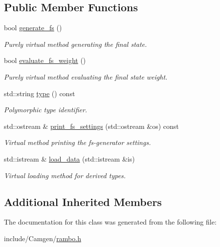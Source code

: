 \subsection*{Public Member Functions}
\begin{DoxyCompactItemize}
\item 
\hypertarget{a00458_a0fcb472d039e483f77b58305b4bd4986}{bool \hyperlink{a00458_a0fcb472d039e483f77b58305b4bd4986}{generate\-\_\-fs} ()}\label{a00458_a0fcb472d039e483f77b58305b4bd4986}

\begin{DoxyCompactList}\small\item\em Purely virtual method generating the final state. \end{DoxyCompactList}\item 
\hypertarget{a00458_ae6e268820d2de91b8282723f3a03eb91}{bool \hyperlink{a00458_ae6e268820d2de91b8282723f3a03eb91}{evaluate\-\_\-fs\-\_\-weight} ()}\label{a00458_ae6e268820d2de91b8282723f3a03eb91}

\begin{DoxyCompactList}\small\item\em Purely virtual method evaluating the final state weight. \end{DoxyCompactList}\item 
\hypertarget{a00458_a8badd899251b3c0b138354e50e755aad}{std\-::string \hyperlink{a00458_a8badd899251b3c0b138354e50e755aad}{type} () const }\label{a00458_a8badd899251b3c0b138354e50e755aad}

\begin{DoxyCompactList}\small\item\em Polymorphic type identifier. \end{DoxyCompactList}\item 
\hypertarget{a00458_aa10fbc5250286a53660b70577f4303ab}{std\-::ostream \& \hyperlink{a00458_aa10fbc5250286a53660b70577f4303ab}{print\-\_\-fs\-\_\-settings} (std\-::ostream \&os) const }\label{a00458_aa10fbc5250286a53660b70577f4303ab}

\begin{DoxyCompactList}\small\item\em Virtual method printing the fs-\/generator settings. \end{DoxyCompactList}\item 
\hypertarget{a00458_a9425dbba74544d2dc13b8ab4fc68068d}{std\-::istream \& \hyperlink{a00458_a9425dbba74544d2dc13b8ab4fc68068d}{load\-\_\-data} (std\-::istream \&is)}\label{a00458_a9425dbba74544d2dc13b8ab4fc68068d}

\begin{DoxyCompactList}\small\item\em Virtual loading method for derived types. \end{DoxyCompactList}\end{DoxyCompactItemize}
\subsection*{Additional Inherited Members}


The documentation for this class was generated from the following file\-:\begin{DoxyCompactItemize}
\item 
include/\-Camgen/\hyperlink{a00728}{rambo.\-h}\end{DoxyCompactItemize}
